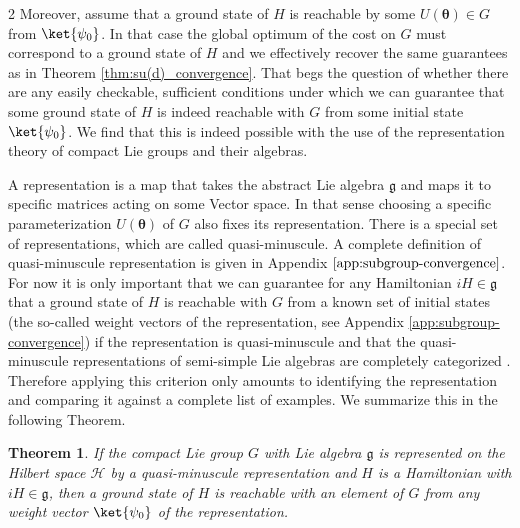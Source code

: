\documentclass{article}
\renewcommand{\vec}[1]{\ensuremath{\boldsymbol{#1}}}
\newtheorem{theorem}{Theorem}
\begin{document}
\begin{multicols}{2}
Moreover, assume that a ground state of \(H\) is reachable by some \(U(\vec{\theta}) \in G\) from \(\ket{\psi_0}\).
In that case the global optimum of the cost on \(G\) must correspond to a ground state of \(H\) and we effectively recover the same guarantees as in Theorem \ref{thm:su(d)_convergence}.
That begs the question of whether there are any easily checkable, sufficient conditions under which we can guarantee that some ground state of \(H\) is indeed reachable with \(G\) from some initial state \(\ket{\psi_0}\).
We find that this is indeed possible with the use of the representation theory of compact Lie groups and their algebras.

A representation is a map that takes the abstract Lie algebra \(\mathfrak{g}\) and maps it to specific matrices acting on some Vector space.
In that sense choosing a specific parameterization \(U(\vec{\theta})\) of \(G\) also fixes its representation.
There is a special set of representations, which are called quasi-minuscule.
A complete definition of quasi-minuscule representation is given in Appendix \(\ref{app:subgroup-convergence}\).
For now it is only important that we can guarantee for any Hamiltonian \(iH \in \mathfrak{g}\) that a ground state of \(H\) is reachable with \(G\) from a known set of initial states (the so-called weight vectors of the representation, see Appendix \ref{app:subgroup-convergence}) if the representation is quasi-minuscule and that the quasi-minuscule representations of semi-simple Lie algebras are completely categorized \cite{lee_polytopes_2017}.
Therefore applying this criterion only amounts to identifying the representation and comparing it against a complete list of examples.
We summarize this in the following Theorem.
\begin{theorem}
    \label{thm:quasi-minuscule}
    If the compact Lie group \(G\) with Lie algebra \(\mathfrak{g}\) is represented on the Hilbert space \(\mathcal{H}\) by a quasi-minuscule representation and \(H\) is a Hamiltonian with \(iH \in \mathfrak{g}\), then a ground state of \(H\) is reachable with an element of \(G\) from any weight vector \(\ket{\psi_0}\) of the representation.
\end{theorem}


\end{multicols}
\end{document}
